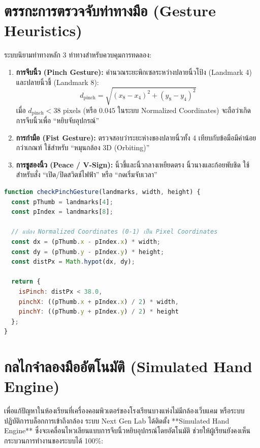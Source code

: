 \section{ตรรกะการตรวจจับท่าทางมือ (Gesture Heuristics)}
ระบบนิยามท่าทางหลัก 3 ท่าทางสำหรับควบคุมการทดลอง:
\begin{enumerate}[leftmargin=1.5em, itemsep=3pt]
    \item \textbf{การจีบนิ้ว (Pinch Gesture):} คำนวณระยะพิกเซลระหว่างปลายนิ้วโป้ง (Landmark 4) และปลายนิ้วชี้ (Landmark 8):
    \begin{equation}
    d_{\text{pinch}} = \sqrt{(x_8 - x_4)^2 + (y_8 - y_4)^2}
    \end{equation}
    เมื่อ $d_{\text{pinch}} < 38\text{ pixels}$ (หรือ $0.045$ ในระบบ Normalized Coordinates) จะถือว่าเกิดการจีบนิ้วเพื่อ “หยิบจับอุปกรณ์”
    \item \textbf{การกำมือ (Fist Gesture):} ตรวจสอบว่าระยะห่างของปลายนิ้วทั้ง 4 เทียบกับข้อมือมีค่าน้อยกว่าเกณฑ์ ใช้สำหรับ “หมุนกล้อง 3D (Orbiting)”
    \item \textbf{การชูสองนิ้ว (Peace / V-Sign):} นิ้วชี้และนิ้วกลางเหยียดตรง นิ้วนางและก้อยพับชิด ใช้สำหรับสั่ง “เปิด/ปิดสวิตช์ไฟฟ้า” หรือ “กดเริ่มจับเวลา”
\end{enumerate}

\begin{lstlisting}[language=JavaScript, caption={โค้ดการตรวจจับ Pinch Gesture ใน ar-mediapipe.js}]
function checkPinchGesture(landmarks, width, height) {
  const pThumb = landmarks[4];
  const pIndex = landmarks[8];
  
  // แปลง Normalized Coordinates (0-1) เป็น Pixel Coordinates
  const dx = (pThumb.x - pIndex.x) * width;
  const dy = (pThumb.y - pIndex.y) * height;
  const distPx = Math.hypot(dx, dy);

  return {
    isPinch: distPx < 38.0,
    pinchX: ((pThumb.x + pIndex.x) / 2) * width,
    pinchY: ((pThumb.y + pIndex.y) / 2) * height
  };
}
\end{lstlisting}

\section{กลไกจำลองมืออัตโนมัติ (Simulated Hand Engine)}
เพื่อแก้ปัญหาในห้องเรียนที่เครื่องคอมพิวเตอร์ของโรงเรียนบางแห่งไม่มีกล้องเว็บแคม หรือระบบปฏิบัติการบล็อกการเข้าถึงกล้อง ระบบ Next Gen Lab ได้ติดตั้ง **Simulated Hand Engine** ซึ่งจะเคลื่อนไหวเลียนแบบการจีบนิ้วหยิบอุปกรณ์โดยอัตโนมัติ ช่วยให้ผู้เรียนยังคงเห็นกระบวนการทำงานของระบบได้ 100\%:

